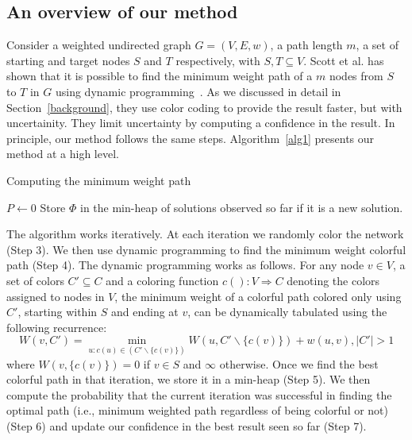 \documentclass{ws-procs11x85}
\begin{document}
\subsection{An overview of our method}

Consider a weighted undirected graph $G = (V, E, w)$, a path length
$m$, a set of starting and target nodes $S$ and $T$ respectively, with
$S, T \subseteq V$.  Scott et al. has shown that it is possible to
find the minimum weight path of a $m$ nodes from $S$ to $T$ in $G$
using dynamic programming~\cite{scott}. As we discussed in detail in
Section~\ref{background}, they use color coding to provide the result
faster, but with uncertainity. They limit uncertainty by computing a
confidence in the result. In principle, our method follows the same
steps. Algorithm~\ref{alg1} presents our method at a high level.

\begin{algorithm}[tbhp]
\caption{Computing the minimum weight path}
\begin{algorithmic}[1]
\STATE $P \leftarrow 0$
   \STATE Store $\Phi$ in the min-heap of solutions observed so far if it is a new solution.
\ENDWHILE
\end{algorithmic}
\label{alg1}
\end{algorithm}


The algorithm works iteratively. At each iteration we randomly color
the network (Step 3). We then use dynamic programming to find the
minimum weight colorful path (Step 4). The dynamic programming works
as follows. For any node $v \in V$, a set of colors $C' \subseteq C$ and a
coloring function $c(): V \Longrightarrow C$ denoting the colors assigned to
nodes in $V$, the minimum weight of a colorful path colored only using $C'$,
starting within $S$ and ending at $v$, can be dynamically tabulated using the
following recurrence\cite{scott}:
\begin{equation}
W(v, C') = \min_{u:c(u) \in (C' \backslash \{c(v)\})} W(u, C' \backslash
\{c(v)\}) + w(u, v), |C'| > 1
\end{equation}
where $W(v, \{c(v)\}) = 0$ if $v \in S$ and $\infty$ otherwise. Once we
find the best colorful path in that iteration, we store it in a
min-heap (Step 5). We then compute the probability that the current
iteration was successful in finding the optimal path (i.e., minimum
weighted path regardless of being colorful or not) (Step 6) and update
our confidence in the best result seen so far (Step 7).
\end{document}
